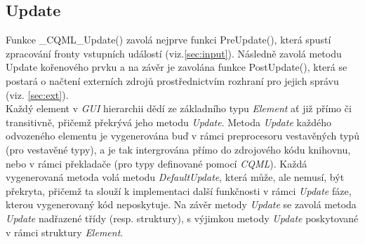 \documentclass[11pt,twoside,a4paper]{book}
\begin{document}
\subsection{Update}
Funkce \_CQML\_Update() zavolá nejprve funkci PreUpdate(), která spustí zpracování fronty vstupních událostí (viz.\ref{sec:input}). Následně zavolá metodu Update kořenového prvku a na závěr je zavolána funkce PostUpdate(), která se postará o načtení externích zdrojů prostřednictvím rozhraní pro jejich správu (viz. \ref{sec:ext}).\\
Každý element v \textit{GUI} hierarchii dědí ze základního typu \textit{Element} ať již přímo či transitivně, přičemž překrývá jeho metodu \textit{Update}. Metoda \textit{Update} každého odvozeného elementu je vygenerována buď v rámci preprocesoru vestavěných typů (pro vestavěné typy), a je tak intergrována přímo do zdrojového kódu knihovnu, nebo v rámci překladače (pro typy definované pomocí \textit{CQML}). Každá vygenerovaná metoda volá metodu \textit{DefaultUpdate}, která může, ale nemusí, být překryta, přičemž ta slouží k implementaci další funkčnosti v rámci \textit{Update} fáze, kterou vygenerovaný kód neposkytuje. Na závěr metody \textit{Update} se zavolá metoda \textit{Update} nadřazené třídy (resp. struktury), s výjimkou metody \textit{Update} poskytované v rámci struktury \textit{Element}.\\
\end{document}
